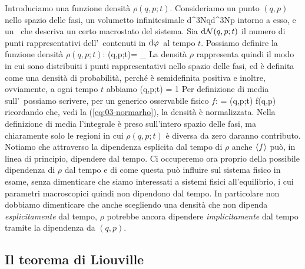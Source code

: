 Introduciamo una funzione densità $\rho(q,p;t)$. Consideriamo un punto $(q,p)$ nello spazio delle fasi, un volumetto infinitesimale
\be
\dephi \equiv \mbox{d}^{3N}q\;\mbox{d}^{3N}p
\ee
intorno a esso, e un \ensemble\ che descriva un certo macrostato del sistema. 
Sia ${\textrm d}{\mathcal N}(q,p;t)$ il numero di punti rappresentativi dell'\ensemble\ contenuti in ${\textrm d}\varphi\,$ al tempo $t$.
Possiamo definire la funzione densità $\rho(q,p;t)$:
\be
\rho(q,p;t)\dephi = \lim_{\calN\to\infty}
\ee
La densità $\rho$ rappresenta quindi il modo in cui sono distribuiti i punti rappresentativi nello spazio delle fasi, ed è definita come una densità di probabilità, perché è semidefinita positiva e inoltre, ovviamente, a ogni tempo $t$ abbiamo
\be
\label{eq:03-normarho}
\int\dephi\rho(q,p;t) = 1
\ee
Per definizione di media sull'\ensemble\ possiamo scrivere, per un generico osservabile fisico $f$:
\be
{} = \int\dephi \rho(q,p;t) f(q,p)
\ee
ricordando che, vedi la (\ref{eq:03-normarho}), la densità è normalizzata.
Nella definizione di media l'integrale è preso sull'intero spazio delle fasi, ma chiaramente solo le regioni in cui $\rho(q,p;t)$ è diversa da zero daranno contributo. Notiamo che attraverso la dipendenza esplicita dal tempo di $\rho$ anche $\langle f\rangle$ può, in linea di principio, dipendere dal tempo. Ci occuperemo ora proprio della possibile dipendenza di $\rho$ dal tempo e di come questa può influire sul sistema fisico in esame, senza dimenticare che siamo interessati a sistemi fisici all'equilibrio, i cui parametri macroscopici quindi non dipendono dal tempo. In particolare non dobbiamo dimenticare che anche scegliendo una densità che non dipenda {\em esplicitamente} dal tempo, $\rho$ potrebbe ancora dipendere {\em implicitamente} dal tempo tramite la dipendenza da $(q,p)$.

\subsection{Il teorema di Liouville}


